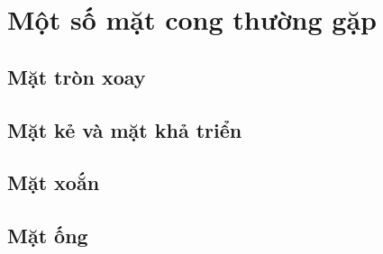 \chapter{Một số mặt cong thường gặp}
\section{Mặt tròn xoay}
\section{Mặt kẻ và mặt khả triển}
\section{Mặt xoắn}
\section{Mặt ống}